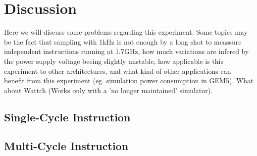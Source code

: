 \section{Discussion}
Here we will discuss some problems regarding this experiment. Some topics may be
the fact that sampling with 1kHz is not enough by a long shot to meassure
independent instructions running at 1.7GHz, how much variations are infered by
the power supply voltage beeing slightly unstable, how applicable is this
experiment to other architectures, and what kind of other applications can
benefit from this experiment (eg. simulation power consumption in GEM5). What
about Wattch (Works only with a 'no longer maintained' simulator).


\subsection{Single-Cycle Instruction}

\subsection{Multi-Cycle Instruction}
